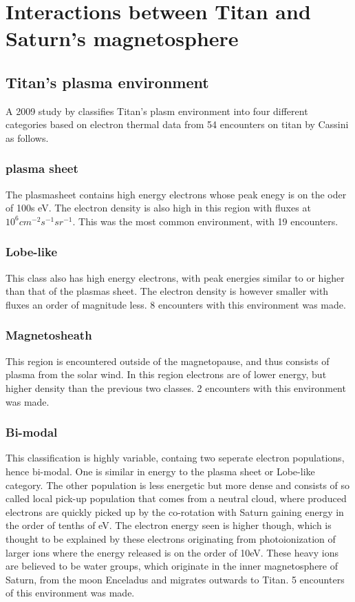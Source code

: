 \documentclass[12pt, parskip=full*, abstract]{scrartcl}
\begin{document}
\section{Interactions between Titan and Saturn's magnetosphere}


\subsection{Titan's plasma environment}
A 2009 study by \textcite{Rymer-class} classifies Titan's plasm environment into four different categories based on electron thermal data from 54 encounters on titan by Cassini as follows. 

\subsubsection{plasma sheet}
The plasmasheet contains high energy electrons whose peak enegy is on the oder of 100s eV. The electron density is also high in this region with fluxes at $10^6cm^{-2}s^{-1}sr^{-1}$. This was the most common environment, with 19 encounters. \parencite{Rymer-class}

\subsubsection{Lobe-like}
This class also has high energy electrons, with peak energies similar to or higher than that of the plasmas sheet. The electron density is however smaller with fluxes an order of magnitude less. 8 encounters with this environment was made.\parencite{Rymer-class}

\subsubsection{Magnetosheath}

This region is encountered outside of the magnetopause, and thus consists of plasma from the solar wind. In this region electrons are of lower energy, but higher density than the previous two classes. 2 encounters with this environment was made.\parencite{Rymer-class}

\subsubsection{Bi-modal}
This classification is highly variable, containg two seperate electron populations, hence bi-modal. One is similar in energy to the plasma sheet or Lobe-like category. The other population is less energetic but more dense and consists of so called local pick-up population that comes from a neutral cloud, where produced electrons are quickly picked up by the co-rotation with Saturn gaining energy in the order of tenths of eV. The electron energy seen is higher though, which is thought to be explained by these electrons originating from photoionization of larger ions where the energy released is on the order of 10eV. These heavy ions are believed to be water groups, which originate in the inner magnetosphere of Saturn, from the moon Enceladus and migrates outwards to Titan. 5 encounters of this environment was made.\parencite{Rymer-class}
\end{document}
